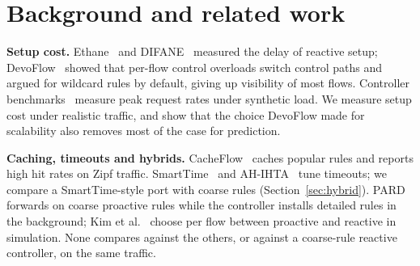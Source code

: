 \documentclass[sigconf]{acmart}
\begin{document}
\section{Background and related work}\label{sec:related}

\textbf{Setup cost.} Ethane~\cite{ethane} and DIFANE~\cite{difane} measured the delay of reactive setup; DevoFlow~\cite{devoflow} showed that per-flow control overloads switch control paths and argued for wildcard rules by default, giving up visibility of most flows. Controller benchmarks~\cite{tootoonchian} measure peak request rates under synthetic load. We measure setup cost under realistic traffic, and show that the choice DevoFlow made for scalability also removes most of the case for prediction.

\textbf{Caching, timeouts and hybrids.} CacheFlow~\cite{cacheflow} caches popular rules and reports high hit rates on Zipf traffic. SmartTime~\cite{smarttime} and AH-IHTA~\cite{ahihta} tune timeouts; we compare a SmartTime-style port with coarse rules (Section~\ref{sec:hybrid}). PARD~\cite{pard} forwards on coarse proactive rules while the controller installs detailed rules in the background; Kim et al.~\cite{kim2022} choose per flow between proactive and reactive in simulation. None compares against the others, or against a coarse-rule reactive controller, on the same traffic.
\end{document}
